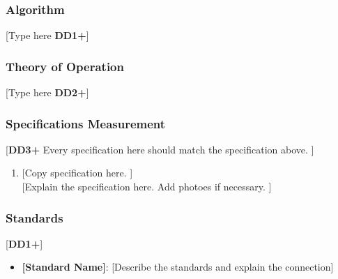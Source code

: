 \subsubsection{Algorithm}
[Type here \textbf{DD1+}]

\subsubsection{Theory of Operation}
[Type here \textbf{DD2+}]
\subsubsection{Specifications Measurement}
[\textbf{DD3+} Every specification here should match the specification above. ]
\begin{enumerate}
    \item {[Copy specification here. ]} \\
          {[Explain the specification here. Add photoes if necessary. ]}
\end{enumerate}

\subsubsection{Standards}
[\textbf{DD1+}]
\begin{itemize}
    \item \textbf{[Standard Name]}: [Describe the standards and explain the connection]
\end{itemize}
